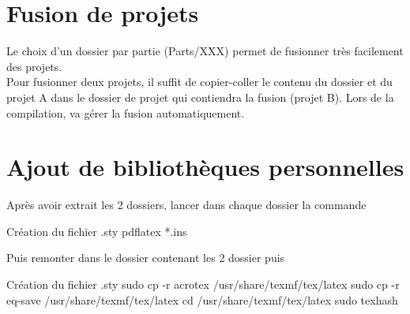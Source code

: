 \chapter{Fusion de projets}

Le choix d'un dossier par partie (Parts/XXX) permet de fusionner très facilement des projets.\\

Pour fusionner deux projets, il suffit de copier-coller le contenu du dossier  et  du projet A 
dans le dossier de projet qui contiendra la fusion (projet B). Lors de la compilation,  va gérer la 
fusion automatiquement.


\chapter{Ajout de bibliothèques personnelles}


Après avoir extrait les 2 dossiers, lancer dans chaque dossier la commande
\begin{Bash}{Création du fichier .sty}
pdflatex *.ins
\end{Bash}

Puis remonter dans le dossier contenant les 2 dossier puis
\begin{Bash}{Création du fichier .sty}
sudo cp -r acrotex /usr/share/texmf/tex/latex
sudo cp -r eq-save /usr/share/texmf/tex/latex
cd /usr/share/texmf/tex/latex
sudo texhash
\end{Bash}
    
